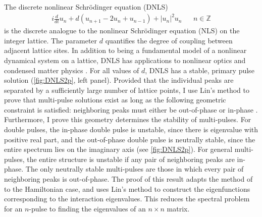 \documentclass[12pt,reqno,oneside,hidelinks]{article}
\begin{document}
The discrete nonlinear Schr{\"o}dinger equation (DNLS) 
\begin{align*}
    i \frac{d}{dt} u_n + d(u_{n+1} - 2 u_n + u_{n-1}) + |u_n|^2 u_n && n \in \mathbb{Z}
\end{align*}
is the discrete analogue to the nonlinear Schr{\"o}dinger equation (NLS) on the integer lattice. The parameter $d$ quantifies the degree of coupling between adjacent lattice sites. In addition to being a fundamental model of a nonlinear dynamical system on a lattice, DNLS has applications to nonlinear optics and condensed matter physics \cite{Kevrekidis2009}. For all values of $d$, DNLS has a stable, primary pulse solution (\cref{fig:DNLS2p}, left panel). Provided that the individual peaks are separated by a sufficiently large number of lattice points, I use Lin's method to prove that multi-pulse solutions exist as long as the following geometric constraint is satisfied: neighboring peaks must either be out-of-phase or in-phase \cite{Parker2020}. Furthermore, I prove this geometry determines the stability of multi-pulses. For double pulses, the in-phase double pulse is unstable, since there is eigenvalue with positive real part, and the out-of-phase double pulse is neutrally stable, since the entire spectrum lies on the imaginary axis (see \cref{fig:DNLS2p}). For general multi-pulses, the entire structure is unstable if any pair of neighboring peaks are in-phase. The only neutrally stable multi-pulses are those in which every pair of neighboring peaks is out-of-phase. The proof of this result \cite[Theorem 2]{Parker2020} adapts the method of \cite{Sandstede1998} to the Hamiltonian case, and uses Lin's method to construct the eigenfunctions corresponding to the interaction eigenvalues. This reduces the spectral problem for an $n$-pulse to finding the eigenvalues of an $n\times n$ matrix.
\end{document}
